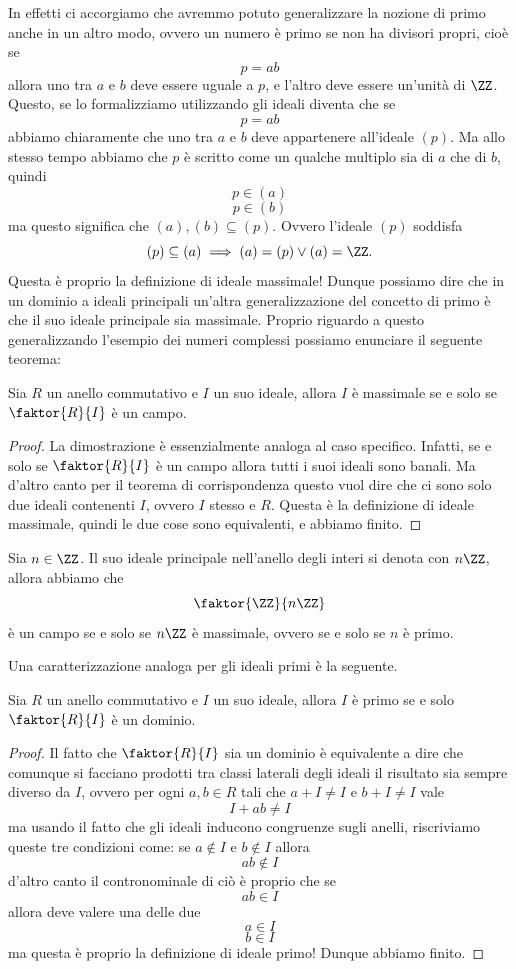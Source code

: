 \documentclass[11pt]{scrartcl}
\begin{document}
	In effetti ci accorgiamo che avremmo potuto generalizzare la nozione di primo anche in un altro modo, ovvero un numero è primo se non ha divisori propri, cioè se 
	$$p=ab$$
	allora uno tra $a$ e $b$ deve essere uguale a $p$, e l'altro deve essere un'unità di $\ZZ$. Questo, se lo formalizziamo utilizzando gli ideali diventa che se
	$$p=ab$$
	abbiamo chiaramente che uno tra $a$ e $b$ deve appartenere all'ideale $(p)$. Ma allo stesso tempo abbiamo che $p$ è scritto come un qualche multiplo sia di $a$ che di $b$, quindi 
	$$p\in (a)$$
	$$p\in (b)$$
	ma questo significa che $(a),(b)\subseteq(p)$. Ovvero l'ideale $(p)$ soddisfa
	$$(p)\subseteq(a) \implies (a)=(p) \lor (a)=\ZZ.$$
	Questa è proprio la definizione di ideale massimale! Dunque possiamo dire che in un dominio a ideali principali un'altra generalizzazione del concetto di primo è che il suo ideale principale sia massimale. Proprio riguardo a questo generalizzando l'esempio dei numeri complessi possiamo enunciare il seguente teorema:
	\begin{proposition}
		Sia $R$ un anello commutativo e $I$ un suo ideale, allora $I$ è massimale se e solo se $\faktor{R}{I}$ è un campo.
	\end{proposition}
	\begin{proof}
		La dimostrazione è essenzialmente analoga al caso specifico.
		Infatti, se e solo se $\faktor{R}{I}$ è un campo allora tutti i suoi ideali sono banali. Ma d'altro canto per il teorema di corrispondenza questo vuol dire che ci sono solo due ideali contenenti $I$, ovvero $I$ stesso e $R$. Questa è la definizione di ideale massimale, quindi le due cose sono equivalenti, e abbiamo finito.
	\end{proof}
	\begin{example}
		Sia $n\in\ZZ$. Il suo ideale principale nell'anello degli interi si denota con $n\ZZ$, allora abbiamo che 
		$$\faktor{\ZZ}{n\ZZ}$$
		è un campo se e solo se $n\ZZ$ è massimale, ovvero se e solo se $n$ è primo.
	\end{example}
	Una caratterizzazione analoga per gli ideali primi è la seguente.
	\begin{proposition}
		Sia $R$ un anello commutativo e $I$ un suo ideale, allora $I$ è primo se e solo $\faktor{R}{I}$ è un dominio. 
	\end{proposition}
	\begin{proof}
		Il fatto che $\faktor{R}{I}$ sia un dominio è equivalente a dire che comunque si facciano prodotti tra classi laterali degli ideali il risultato sia sempre diverso da $I$, ovvero per ogni $a,b\in R$ tali che $a+I\ne I$ e $b+I\ne I$ vale
		$$I+ab\ne I$$
		ma usando il fatto che gli ideali inducono congruenze sugli anelli, riscriviamo queste tre condizioni come: se $a\not\in I$ e $b\not\in I$ allora
		$$ab\not\in I$$
		d'altro canto il contronominale di ciò è proprio che se 
		$$ab\in I$$
		allora deve valere una delle due
		$$a\in I$$
		$$b\in I$$
		ma questa è proprio la definizione di ideale primo! Dunque abbiamo finito.
	\end{proof}
\end{document}

